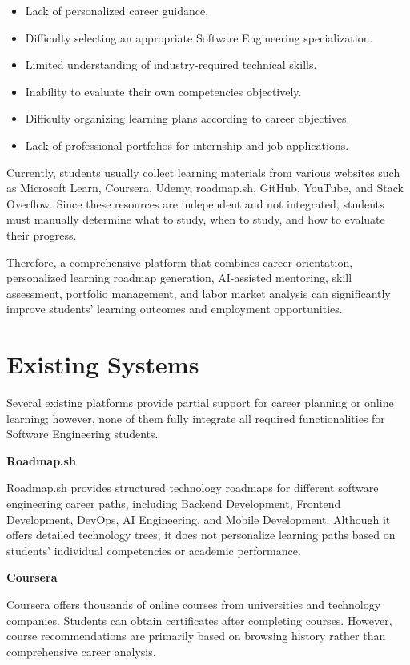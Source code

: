\begin{itemize}
    \item Lack of personalized career guidance.
    \item Difficulty selecting an appropriate Software Engineering specialization.
    \item Limited understanding of industry-required technical skills.
    \item Inability to evaluate their own competencies objectively.
    \item Difficulty organizing learning plans according to career objectives.
    \item Lack of professional portfolios for internship and job applications.
\end{itemize}

Currently, students usually collect learning materials from various websites such as Microsoft Learn, Coursera, Udemy, roadmap.sh, GitHub, YouTube, and Stack Overflow. Since these resources are independent and not integrated, students must manually determine what to study, when to study, and how to evaluate their progress.

Therefore, a comprehensive platform that combines career orientation, personalized learning roadmap generation, AI-assisted mentoring, skill assessment, portfolio management, and labor market analysis can significantly improve students' learning outcomes and employment opportunities.


\section{Existing Systems}

Several existing platforms provide partial support for career planning or online learning; however, none of them fully integrate all required functionalities for Software Engineering students. 

\textbf{Roadmap.sh} 
    
    Roadmap.sh provides structured technology roadmaps for different software engineering career paths, including Backend Development, Frontend Development, DevOps, AI Engineering, and Mobile Development. Although it offers detailed technology trees, it does not personalize learning paths based on students' individual competencies or academic performance. 
    
\textbf{Coursera} 

    Coursera offers thousands of online courses from universities and technology companies. Students can obtain certificates after completing courses. However, course recommendations are primarily based on browsing history rather than comprehensive career analysis. 
    
